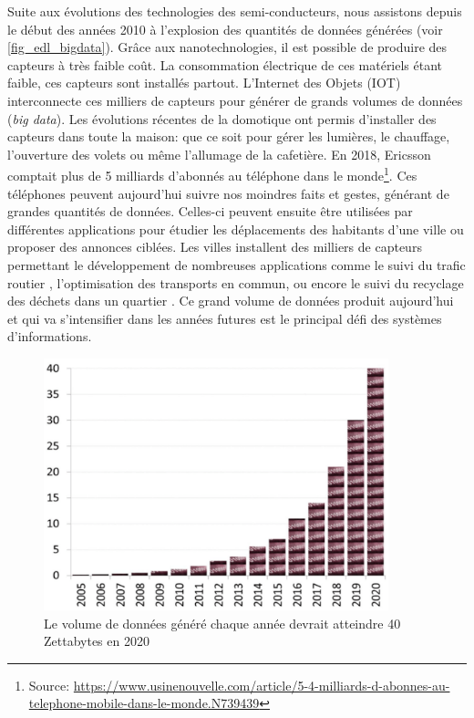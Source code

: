             Suite aux évolutions des technologies des semi-conducteurs, nous assistons depuis le début des années 2010 à l'explosion des quantités de données générées (voir \autoref{fig_edl_bigdata}). Grâce aux nanotechnologies, il est possible de produire des capteurs à très faible coût. La consommation électrique de ces matériels étant faible, ces capteurs sont installés partout. L’Internet des Objets (IOT) interconnecte ces milliers de capteurs pour générer de grands volumes de données (\textit{big data}).  Les évolutions récentes de la domotique ont permis d'installer des capteurs dans toute la maison: que ce soit pour gérer les lumières, le chauffage, l'ouverture des volets ou même l'allumage de la cafetière. En 2018, Ericsson comptait plus de 5 milliards d'abonnés au téléphone dans le monde\footnote{Source: \url{https://www.usinenouvelle.com/article/5-4-milliards-d-abonnes-au-telephone-mobile-dans-le-monde.N739439}}. Ces téléphones peuvent aujourd'hui suivre nos moindres faits et gestes, générant de grandes quantités de données. Celles-ci peuvent ensuite être utilisées par différentes applications pour étudier les déplacements des habitants d'une ville ou proposer des annonces ciblées. Les villes installent des milliers de capteurs permettant le développement de nombreuses applications comme le suivi du trafic routier \cite{bonhomme:hal-01334670}, l'optimisation des transports en commun, ou encore le suivi du recyclage des déchets dans un quartier \cite{Rebelles2018}. Ce grand volume de données produit aujourd'hui et qui va s'intensifier dans les années futures est le principal défi des systèmes d'informations.
        
              
            \begin{figure}
            \center
            \includegraphics[width=10cm]{images/edl_bigdata.png}
            \caption{\label{fig_edl_bigdata} Le volume de données généré chaque année devrait atteindre 40 Zettabytes en 2020 \cite{Simoudis2016}}
            \end{figure}
        
